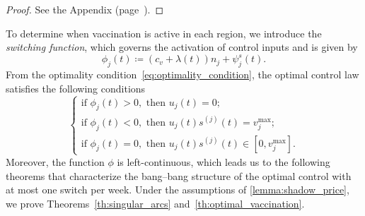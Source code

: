 \documentclass[letterpaper, 10 pt, conference]{ieeeconf}
\begin{document}
\vspace{5pt}

\begin{proof}
    See the Appendix (page~\pageref{proof:shadow_price}).
\end{proof}

To determine when vaccination is active in each region, we introduce the {\it switching function}, which governs the activation of control inputs and is given by
\begin{equation}
    \label{eq:switching_function}
    \phi_j(t) \coloneqq (c_v + \lambda(t))n_j + \psi_j^s(t).
\end{equation}
From the optimality condition~\eqref{eq:optimality_condition}, the optimal control law satisfies the following conditions
\[
\begin{cases}
    \text{if }\phi_j(t) > 0, \text{ then } u_j(t) = 0; \\
    \text{if }\phi_j(t) < 0, \text{ then } u_j(t) s^{(j)}(t) = v_j^{\max}; \\
    \text{if }\phi_j(t) = 0, \text{ then } u_j(t) s^{(j)}(t) \in [0, v_j^{\max}].
\end{cases}
\]
Moreover, the function $\phi$ is left-continuous, which leads us to the following theorems that characterize the bang--bang structure of the optimal control with at most one switch per week.
Under the assumptions of \autoref{lemma:shadow_price}, we prove Theorems~\ref{th:singular_arcs} and~\ref{th:optimal_vaccination}.
\end{document}
